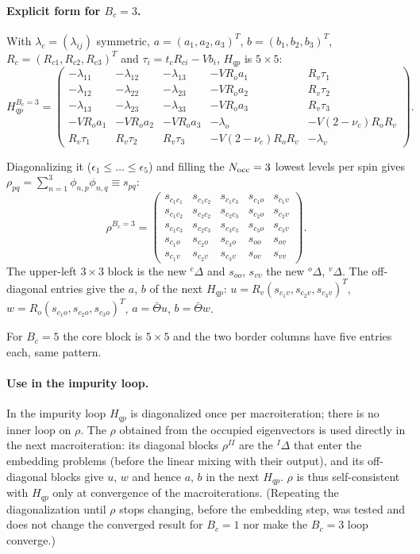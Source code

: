 \documentclass[11pt]{article}
\begin{document}
\paragraph{Explicit form for $B_c=3$.} With $\lambda_c=(\lambda_{ij})$ symmetric, $a=(a_1,a_2,a_3)^T$, $b=(b_1,b_2,b_3)^T$, $R_c=(R_{c1},R_{c2},R_{c3})^T$ and
$\tau_i=t_cR_{ci}-Vb_i$, $H_{qp}$ is $5\times5$:
\begin{equation}
H_{qp}^{B_c=3}=
\begin{pmatrix}
-\lambda_{11} & -\lambda_{12} & -\lambda_{13} & -VR_oa_1 & R_v\tau_1\\
-\lambda_{12} & -\lambda_{22} & -\lambda_{23} & -VR_oa_2 & R_v\tau_2\\
-\lambda_{13} & -\lambda_{23} & -\lambda_{33} & -VR_oa_3 & R_v\tau_3\\
-VR_oa_1 & -VR_oa_2 & -VR_oa_3 & -\lambda_o & -V(2-\nu_c)R_oR_v\\
R_v\tau_1 & R_v\tau_2 & R_v\tau_3 & -V(2-\nu_c)R_oR_v & -\lambda_v
\end{pmatrix}.
\end{equation}

Diagonalizing it ($\epsilon_1\le\dots\le\epsilon_5$) and filling the $N_{\rm occ}=3$ lowest levels per spin gives
$\rho_{pq}=\sum_{n=1}^{3}\phi_{n,p}\phi_{n,q}\equiv s_{pq}$:
\begin{equation}
\rho^{B_c=3}=
\begin{pmatrix}
s_{c_1c_1}&s_{c_1c_2}&s_{c_1c_3}&s_{c_1o}&s_{c_1v}\\
s_{c_1c_2}&s_{c_2c_2}&s_{c_2c_3}&s_{c_2o}&s_{c_2v}\\
s_{c_1c_3}&s_{c_2c_3}&s_{c_3c_3}&s_{c_3o}&s_{c_3v}\\
s_{c_1o}&s_{c_2o}&s_{c_3o}&s_{oo}&s_{ov}\\
s_{c_1v}&s_{c_2v}&s_{c_3v}&s_{ov}&s_{vv}
\end{pmatrix}.
\end{equation}
The upper-left $3\times3$ block is the new ${}^c\Delta$ and $s_{oo}$, $s_{vv}$ the new ${}^o\Delta$, ${}^v\Delta$. The off-diagonal entries give the $a$, $b$ of the next
$H_{qp}$: $u=R_v(s_{c_1v},s_{c_2v},s_{c_3v})^T$, $w=R_o(s_{c_1o},s_{c_2o},s_{c_3o})^T$, $a=\bar\Theta u$, $b=\bar\Theta w$.

For $B_c=5$ the core block is $5\times5$ and the two border columns have five entries each, same pattern.

\paragraph{Use in the impurity loop.} In the impurity loop $H_{qp}$ is diagonalized once per macroiteration; there is no inner loop on $\rho$.
The $\rho$ obtained from the occupied eigenvectors is used directly in the next macroiteration: its diagonal blocks $\rho^{II}$ are the ${}^I\Delta$ that
enter the embedding problems (before the linear mixing with their output), and its off-diagonal blocks give $u$, $w$ and hence $a$, $b$ in the next $H_{qp}$.
$\rho$ is thus self-consistent with $H_{qp}$ only at convergence of the macroiterations. (Repeating the diagonalization until $\rho$ stops changing, before the embedding step, was tested
and does not change the converged result for $B_c=1$ nor make the $B_c=3$ loop converge.)
\end{document}
